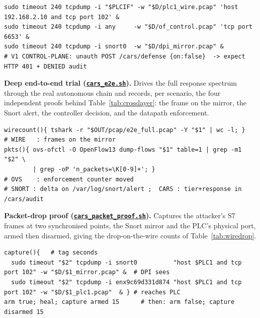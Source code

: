 \begin{lstlisting}[style=carssrc,caption={The three capture points and the control-plane vector.},label={lst:wirecamp}]
sudo timeout 240 tcpdump -i "$PLCIF" -w "$D/plc1_wire.pcap" 'host 192.168.2.10 and tcp port 102' &
sudo timeout 240 tcpdump -i any     -w "$D/of_control.pcap" 'tcp port 6653' &
sudo timeout 240 tcpdump -i snort0  -w "$D/dpi_mirror.pcap" &
# V1 CONTROL-PLANE: unauth POST /cars/defense {on:false}  -> expect HTTP 401 + DENIED audit
\end{lstlisting}

\noindent \textbf{Deep end-to-end trial (\href{\repourl/blob/main/06_Build/cars_e2e.sh}{\texttt{cars\_e2e.sh}}).} Drives the full response spectrum through the real autonomous chain and records, per scenario, the four independent proofs behind Table~\ref{tab:crosslayer}: the frame on the mirror, the Snort alert, the controller decision, and the datapath enforcement.

\begin{lstlisting}[style=carssrc,caption={The four independent ground-truth layers per scenario.},label={lst:e2e}]
wirecount(){ tshark -r "$OUT/pcap/e2e_full.pcap" -Y "$1" | wc -l; }        # WIRE   : frames on the mirror
pkts(){ ovs-ofctl -O OpenFlow13 dump-flows "$1" table=1 | grep -m1 "$2" \
        | grep -oP 'n_packets=\K[0-9]+'; }                                  # OVS    : enforcement counter moved
# SNORT : delta on /var/log/snort/alert ;  CARS : tier+response in /cars/audit
\end{lstlisting}

\noindent \textbf{Packet-drop proof (\href{\repourl/blob/main/06_Build/cars_packet_proof.sh}{\texttt{cars\_packet\_proof.sh}}).} Captures the attacker's S7 frames at two synchronised points, the Snort mirror and the PLC's physical port, armed then disarmed, giving the drop-on-the-wire counts of Table~\ref{tab:wiredrop}.

\begin{lstlisting}[style=carssrc,caption={Two synchronised capture points: what the detector sees versus what reaches the PLC.},label={lst:pktproof}]
capture(){   # tag seconds
  sudo timeout "$2" tcpdump -i snort0          "host $PLC1 and tcp port 102" -w "$D/$1_mirror.pcap" &  # DPI sees
  sudo timeout "$2" tcpdump -i enx9c69d331d874 "host $PLC1 and tcp port 102" -w "$D/$1_plc1.pcap"  & } # reaches PLC
arm true; heal; capture armed 15      # then: arm false; capture disarmed 15
\end{lstlisting}

